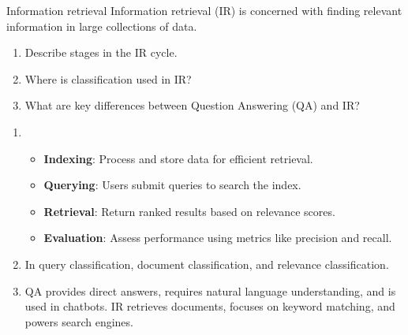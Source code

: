 \documentclass{article}
\begin{document}
\begin{exercise}{Information retrieval}\label{ex:ir}
  Information retrieval (IR) is concerned with finding relevant information in large collections of data.
  \begin{enumerate}
    \item Describe stages in the IR cycle.
    \item Where is classification used in IR?
    \item What are key differences between Question Answering (QA) and IR?
  \end{enumerate}

  \begin{solution}
    \begin{enumerate}
        \item \begin{itemize}
            \item \textbf{Indexing}: Process and store data for efficient retrieval.
            \item \textbf{Querying}: Users submit queries to search the index.
            \item \textbf{Retrieval}: Return ranked results based on relevance scores.
            \item \textbf{Evaluation}: Assess performance using metrics like precision and recall.
          \end{itemize}
        \item In query classification, document classification, and relevance classification.
        \item QA provides direct answers, requires natural language understanding, and is used in chatbots. IR retrieves documents, focuses on keyword matching, and powers search engines.
    \end{enumerate}
  \end{solution}
\end{exercise}
\end{document}
